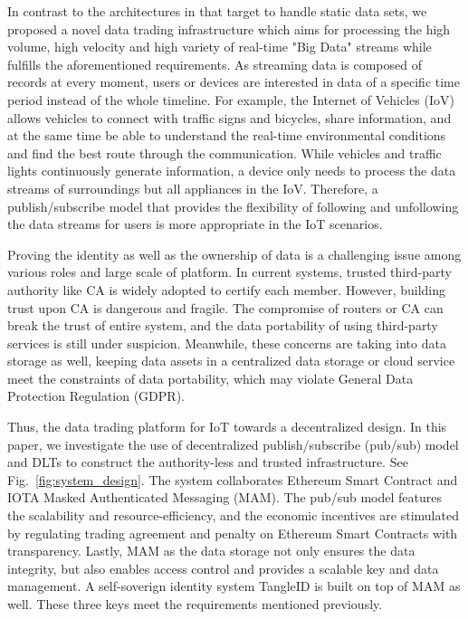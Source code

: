 \documentclass[conference]{IEEEtran}
\begin{document}
In contrast to the architectures in \cite{DIaas, MARSA} that target to handle static data sets, we proposed a novel data trading infrastructure which aims for processing the high volume, high velocity and high variety of real-time "Big Data" streams\cite{BigData} while fulfills the aforementioned requirements. As streaming data is composed of records at every moment, users or devices are interested in data of a specific time period instead of the whole timeline. For example, the Internet of Vehicles (IoV) allows vehicles to connect with traffic signs and bicycles, share information, and at the same time be able to understand the real-time environmental conditions and find the best route through the communication. While vehicles and traffic lights continuously generate information, a device only needs to process the data streams of surroundings but all appliances in the IoV. Therefore, a publish/subscribe model that provides the flexibility of following and unfollowing the data streams for users is more appropriate in the IoT scenarios. 

Proving the identity as well as the ownership of data is a challenging issue among various roles and large scale of platform. In current systems, trusted third-party authority like CA is widely adopted to certify each member. However, building trust upon CA is dangerous and fragile. The compromise of routers or CA can break the trust of entire system, and the data portability of using third-party services is still under suspicion. Meanwhile, these concerns are taking into data storage as well, keeping data assets in a centralized data storage or cloud service meet the constraints of data portability, which may violate General Data Protection Regulation (GDPR)\cite{GDPR}.

Thus, the data trading platform for IoT towards a decentralized design. In this paper, 
we investigate the use of decentralized publish/subscribe (pub/sub) model and DLTs to construct the authority-less and trusted infrastructure. See Fig.~\ref{fig:system_design}. The system collaborates Ethereum Smart Contract\cite{smartContract} and IOTA\cite{IOTAwhitepaper} Masked Authenticated Messaging (MAM)\cite{MAM}. The pub/sub model features the scalability and resource-efficiency, and the economic incentives are stimulated by regulating trading agreement and penalty on Ethereum Smart Contracts with transparency. Lastly, MAM as the data storage not only ensures the data integrity, but also enables access control and provides a scalable key and data management. A self-soverign identity system TangleID\cite{TangleID} is built on top of MAM as well. These three keys meet the requirements mentioned previously.   
\end{document}
